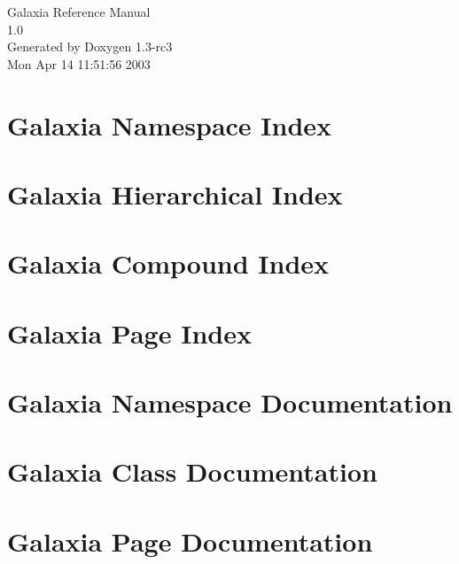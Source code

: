 \documentclass[a4paper]{book}
\begin{document}
\begin{titlepage}
\vspace*{7cm}
\begin{center}
{\Large Galaxia Reference Manual\\[1ex]\large 1.0}\\
\vspace*{1cm}
{\large Generated by Doxygen 1.3-rc3}\\
\vspace*{0.5cm}
{\small Mon Apr 14 11:51:56 2003}\\
\end{center}
\end{titlepage}
\clearemptydoublepage
{}
\tableofcontents
\clearemptydoublepage
{}
\chapter{Galaxia Namespace Index}

\chapter{Galaxia Hierarchical Index}

\chapter{Galaxia Compound Index}

\chapter{Galaxia Page Index}

\chapter{Galaxia Namespace Documentation}

\chapter{Galaxia Class Documentation}






\chapter{Galaxia Page Documentation}

\printindex
\end{document}
